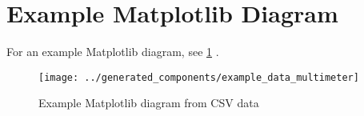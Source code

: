 \section{Example Matplotlib Diagram}

For an example Matplotlib diagram, see
\cref{example_matplotlib_plot}%
.

\begin{figure}[h]
    \centering
    \texttt{[image: ../generated\_components/example\_data\_multimeter]}
    \caption{Example Matplotlib diagram from CSV data}
    \label{example_matplotlib_plot}
\end{figure}
